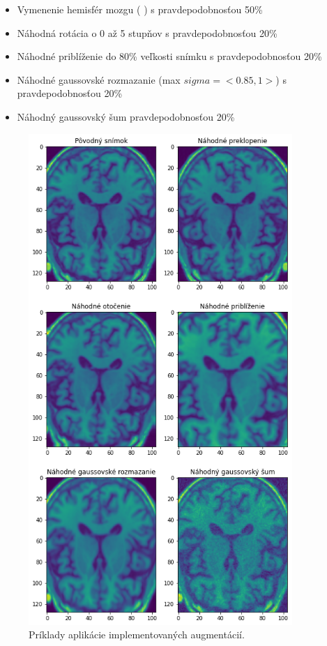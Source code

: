 \begin{itemize}
    \item Vymenenie hemisfér mozgu (\citeauthor*{esmaeilzadeh2018end} \cite{esmaeilzadeh2018end}) s pravdepodobnosťou 50\%
    \item Náhodná rotácia o 0 až 5 stupňov s pravdepodobnosťou 20\%
    \item Náhodné priblíženie do 80\% veľkosti snímku s pravdepodobnosťou 20\%
    \item Náhodné gaussovské rozmazanie (max $sigma = <0.85, 1>$) s pravdepodobnosťou 20\%
    \item Náhodný gaussovský šum pravdepodobnosťou 20\%
\end{itemize}

\begin{figure}[h!]
    \centering
    \includegraphics[width=10cm]{assets/images/augmentations.png}
    \caption{Príklady aplikácie implementovaných augmentácií.}
    \label{fig:augmentations}
\end{figure}

